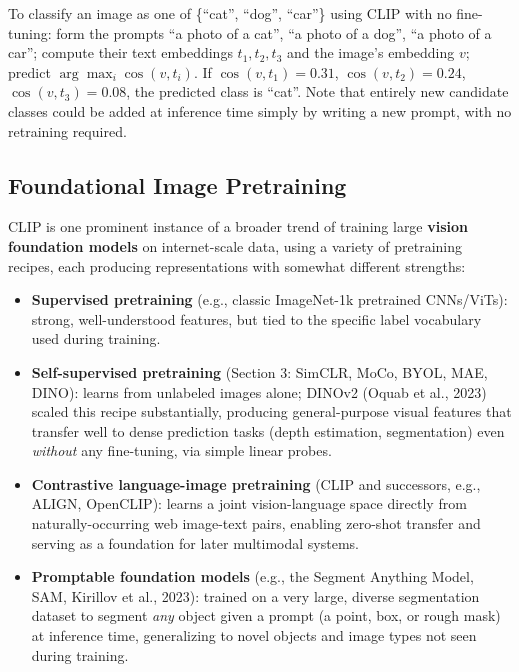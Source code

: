 \documentclass[12pt,a4paper]{article}
\begin{document}
\begin{example}
To classify an image as one of \{``cat'', ``dog'', ``car''\} using CLIP with no fine-tuning: form the prompts ``a photo of a cat'', ``a photo of a dog'', ``a photo of a car''; compute their text embeddings $t_1, t_2, t_3$ and the image's embedding $v$; predict $\arg\max_i \cos(v, t_i)$. If $\cos(v,t_1) = 0.31$, $\cos(v,t_2) = 0.24$, $\cos(v,t_3) = 0.08$, the predicted class is ``cat''. Note that entirely new candidate classes could be added at inference time simply by writing a new prompt, with no retraining required.
\end{example}

\subsection{Foundational Image Pretraining}

CLIP is one prominent instance of a broader trend of training large \textbf{vision foundation models} on internet-scale data, using a variety of pretraining recipes, each producing representations with somewhat different strengths:

\begin{itemize}[leftmargin=1.5em]
    \item \textbf{Supervised pretraining} (e.g., classic ImageNet-1k pretrained CNNs/ViTs): strong, well-understood features, but tied to the specific label vocabulary used during training.
    \item \textbf{Self-supervised pretraining} (Section 3: SimCLR, MoCo, BYOL, MAE, DINO): learns from unlabeled images alone; DINOv2 (Oquab et al., 2023) scaled this recipe substantially, producing general-purpose visual features that transfer well to dense prediction tasks (depth estimation, segmentation) even \emph{without} any fine-tuning, via simple linear probes.
    \item \textbf{Contrastive language-image pretraining} (CLIP and successors, e.g., ALIGN, OpenCLIP): learns a joint vision-language space directly from naturally-occurring web image-text pairs, enabling zero-shot transfer and serving as a foundation for later multimodal systems.
    \item \textbf{Promptable foundation models} (e.g., the Segment Anything Model, SAM, Kirillov et al., 2023): trained on a very large, diverse segmentation dataset to segment \emph{any} object given a prompt (a point, box, or rough mask) at inference time, generalizing to novel objects and image types not seen during training.
\end{itemize}
\end{document}
